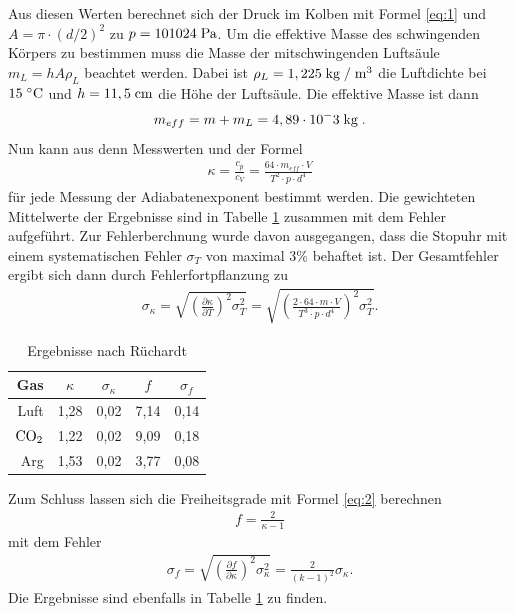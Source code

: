 \documentclass[12pt, a4paper, twoside]{scrartcl}
\begin{document}
Aus diesen Werten berechnet sich der Druck im Kolben mit Formel \ref{eq:1} und $A=\pi\cdot (d/2)^2$ zu $p=101024\pascal$. Um die effektive Masse des schwingenden Körpers zu bestimmen muss die Masse der mitschwingenden Luftsäule $m_L=hA\rho_L$ beachtet werden. Dabei ist $\rho_L=1,225\kilogramm/\meter^3$ die Luftdichte bei $15\degree\celsius$ und $h=11,5\centi\meter$ die Höhe der Luftsäule. Die effektive Masse ist dann
\begin{align*}
m_{eff}=m+m_L=4,89\cdot10^-3\kilogramm.
\end{align*}
Nun kann aus denn Messwerten und der Formel
\begin{align*}
\kappa=\frac{c_p}{c_V}=\frac{64\cdot m_{eff}\cdot V}{T^2\cdot p\cdot d^4}
\end{align*}
für jede Messung der Adiabatenexponent bestimmt werden. Die gewichteten Mittelwerte der Ergebnisse sind in Tabelle \ref{tab:ruechardt} zusammen mit dem Fehler aufgeführt. Zur Fehlerberchnung wurde davon ausgegangen, dass die Stopuhr mit einem systematischen Fehler $\sigma_T$ von maximal 3\% behaftet ist. Der Gesamtfehler ergibt sich dann durch Fehlerfortpflanzung zu
\begin{align*}
\sigma_\kappa=\sqrt{\left(\frac{\partial\kappa}{\partial T}\right)^2\sigma_T^2}=\sqrt{\left(\frac{2\cdot64\cdot m\cdot V}{T^3\cdot p \cdot d^4}\right)^2\sigma_T^2}.
\end{align*}

\begin{table} [H]
\centering
\begin{tabular}{|r|c|c|c|c|} \hline
    Gas & $\kappa$ & $\sigma_\kappa$ & $f$ & $\sigma_f$ \\ \hline
    Luft & 1,28& 0,02 & 7,14 &  0,14\\
    $\rm{CO_2}$ & 1,22& 0,02 & 9,09 & 0,18 \\
    Arg & 1,53& 0,02 & 3,77 &  0,08 \\ \hline
 \end{tabular} 
 \caption{\label{tab:ruechardt}Ergebnisse nach Rüchardt}
\end{table}

Zum Schluss lassen sich die Freiheitsgrade mit Formel \ref{eq:2} berechnen
\begin{align*}
f=\frac{2}{\kappa-1}
\end{align*}
mit dem Fehler
\begin{align*}
\sigma_f=\sqrt{\left(\frac{\partial f}{\partial \kappa}\right)^2\sigma_\kappa^2}=\frac{2}{\left(k-1\right)^2}\sigma_\kappa.
\end{align*}
Die Ergebnisse sind ebenfalls in Tabelle \ref{tab:ruechardt} zu finden.
\end{document}
